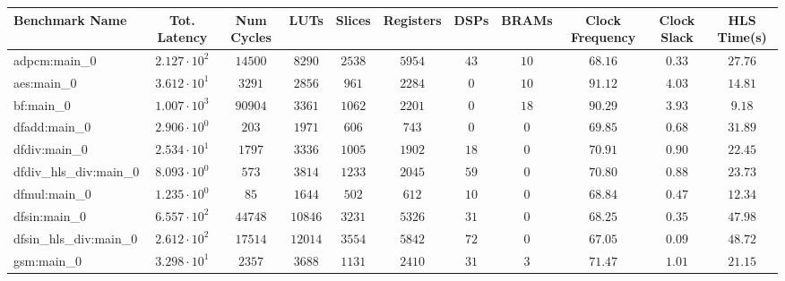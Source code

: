 \begin{tabular}{|l|c|c|c|c|c|c|c|c|c|c|}
\hline
Benchmark Name          & Tot. Latency           & Num Cycles & LUTs      & Slices    & Registers & DSPs    & BRAMs   & Clock Frequency & Clock Slack & HLS Time(s) \\
\hline
adpcm:main\_0           & $ 2.127 \cdot 10^{2} $ & $ 14500  $ & $ 8290  $ & $ 2538  $ & $ 5954  $ & $ 43  $ & $ 10  $ & $ 68.16       $ & $ 0.33    $ & $ 27.76   $ \\
aes:main\_0             & $ 3.612 \cdot 10^{1} $ & $ 3291   $ & $ 2856  $ & $ 961   $ & $ 2284  $ & $ 0   $ & $ 10  $ & $ 91.12       $ & $ 4.03    $ & $ 14.81   $ \\
bf:main\_0              & $ 1.007 \cdot 10^{3} $ & $ 90904  $ & $ 3361  $ & $ 1062  $ & $ 2201  $ & $ 0   $ & $ 18  $ & $ 90.29       $ & $ 3.93    $ & $ 9.18    $ \\
dfadd:main\_0           & $ 2.906 \cdot 10^{0} $ & $ 203    $ & $ 1971  $ & $ 606   $ & $ 743   $ & $ 0   $ & $ 0   $ & $ 69.85       $ & $ 0.68    $ & $ 31.89   $ \\
dfdiv:main\_0           & $ 2.534 \cdot 10^{1} $ & $ 1797   $ & $ 3336  $ & $ 1005  $ & $ 1902  $ & $ 18  $ & $ 0   $ & $ 70.91       $ & $ 0.90    $ & $ 22.45   $ \\
dfdiv\_hls\_div:main\_0 & $ 8.093 \cdot 10^{0} $ & $ 573    $ & $ 3814  $ & $ 1233  $ & $ 2045  $ & $ 59  $ & $ 0   $ & $ 70.80       $ & $ 0.88    $ & $ 23.73   $ \\
dfmul:main\_0           & $ 1.235 \cdot 10^{0} $ & $ 85     $ & $ 1644  $ & $ 502   $ & $ 612   $ & $ 10  $ & $ 0   $ & $ 68.84       $ & $ 0.47    $ & $ 12.34   $ \\
dfsin:main\_0           & $ 6.557 \cdot 10^{2} $ & $ 44748  $ & $ 10846 $ & $ 3231  $ & $ 5326  $ & $ 31  $ & $ 0   $ & $ 68.25       $ & $ 0.35    $ & $ 47.98   $ \\
dfsin\_hls\_div:main\_0 & $ 2.612 \cdot 10^{2} $ & $ 17514  $ & $ 12014 $ & $ 3554  $ & $ 5842  $ & $ 72  $ & $ 0   $ & $ 67.05       $ & $ 0.09    $ & $ 48.72   $ \\
gsm:main\_0             & $ 3.298 \cdot 10^{1} $ & $ 2357   $ & $ 3688  $ & $ 1131  $ & $ 2410  $ & $ 31  $ & $ 3   $ & $ 71.47       $ & $ 1.01    $ & $ 21.15   $ \\

\end{tabular}
